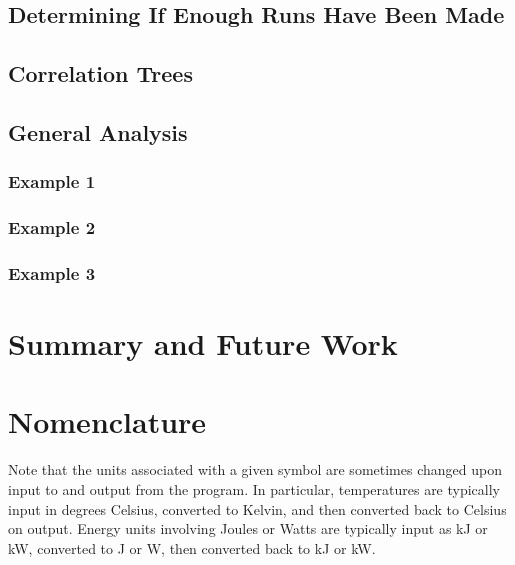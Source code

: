 \documentclass[12pt,twoside]{book}
\begin{document}
\section{Determining If Enough Runs Have Been Made}

\section{Correlation Trees}

\section{General Analysis}

\subsection{Example 1}

\subsection{Example 2}

\subsection{Example 3}

%
%

\chapter{Summary and Future Work}



\appendix
{}

%
%

\chapter{Nomenclature}
\label{nomenclature}

Note that the units associated with a given symbol are sometimes changed upon input to and output from the program. In particular, temperatures are typically input in degrees Celsius, converted to Kelvin, and then converted back to Celsius on output. Energy units involving Joules or Watts are typically input as kJ or kW, converted to J or W, then converted back to kJ or kW.
\end{document}
